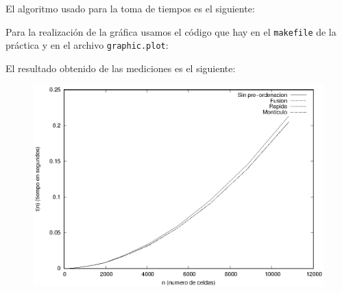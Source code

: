El algoritmo usado para la toma de tiempos es el siguiente:

Para la realización de la gráfica usamos el código que hay en el \texttt{makefile} de la práctica y en el archivo \texttt{graphic.plot}:

\newpage
El resultado obtenido de las mediciones es el siguiente:
\begin{center}
	\begin{figure}[h]
		\centering
		\includegraphics{graphic.eps}
	\end{figure}
\end{center}
